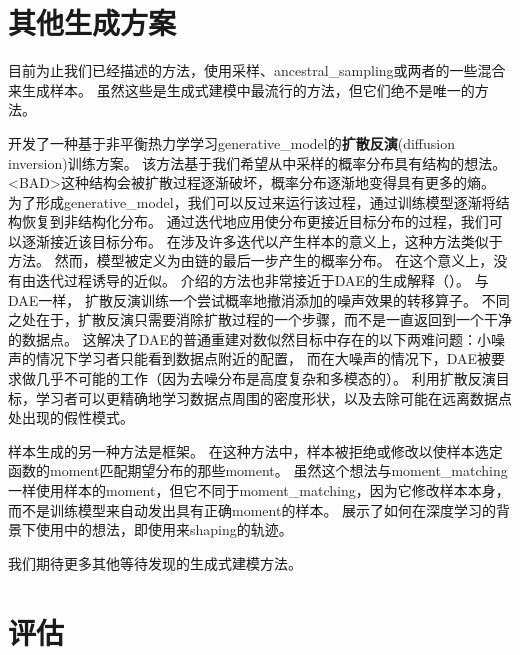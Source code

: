 
\section{其他生成方案}
\label{sec:other_generation_schemes}
目前为止我们已经描述的方法，使用采样、\gls{ancestral_sampling}或两者的一些混合来生成样本。
虽然这些是生成式建模中最流行的方法，但它们绝不是唯一的方法。


\citet{Sohl-Dickstein-et-al-ICML2015} 开发了一种基于非平衡热力学学习\gls{generative_model}的\textbf{扩散反演}(diffusion inversion)训练方案。
该方法基于我们希望从中采样的概率分布具有结构的想法。
<BAD>这种结构会被扩散过程逐渐破坏，概率分布逐渐地变得具有更多的熵。
为了形成\gls{generative_model}，我们可以反过来运行该过程，通过训练模型逐渐将结构恢复到非结构化分布。
通过迭代地应用使分布更接近目标分布的过程，我们可以逐渐接近该目标分布。
在涉及许多迭代以产生样本的意义上，这种方法类似于方法。
然而，模型被定义为由链的最后一步产生的概率分布。
在这个意义上，没有由迭代过程诱导的近似。
\citet{Sohl-Dickstein-et-al-ICML2015} 介绍的方法也非常接近于\gls{DAE}的生成解释（）。
与\gls{DAE}一样， 扩散反演训练一个尝试概率地撤消添加的噪声效果的转移算子。
不同之处在于，扩散反演只需要消除扩散过程的一个步骤，而不是一直返回到一个干净的数据点。
这解决了\gls{DAE}的普通重建对数似然目标中存在的以下两难问题：小噪声的情况下学习者只能看到数据点附近的配置， 而在大噪声的情况下，\gls{DAE}被要求做几乎不可能的工作（因为去噪分布是高度复杂和多模态的）。
利用扩散反演目标，学习者可以更精确地学习数据点周围的密度形状，以及去除可能在远离数据点处出现的假性模式。

样本生成的另一种方法是框架\citep{rubin1984bayesianly}。
在这种方法中，样本被拒绝或修改以使样本选定函数的\gls{moment}匹配期望分布的那些\gls{moment}。
虽然这个想法与\gls{moment_matching}一样使用样本的\gls{moment}，但它不同于\gls{moment_matching}，因为它修改样本本身，而不是训练模型来自动发出具有正确\gls{moment}的样本。
\citet{BachmanP15} 展示了如何在深度学习的背景下使用中的想法，即使用来\gls{shaping}的轨迹。

我们期待更多其他等待发现的生成式建模方法。


\section{评估}
\label{sec:evaluating_generative_models}

